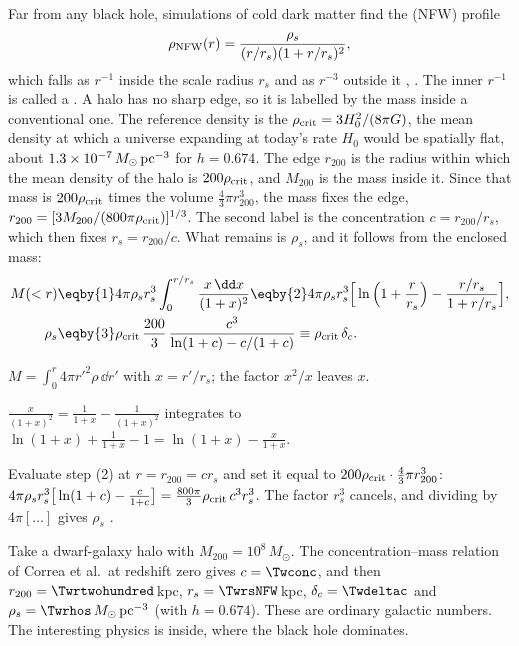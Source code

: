 Far from any black hole, simulations of cold dark matter find the  (NFW) profile
\begin{equation}
  \rho_{\rm NFW}(r)=\frac{\rho_s}{(r/r_s)(1+r/r_s)^2},
  \label{T2a:eq:nfw}
\end{equation}
which falls as $r^{-1}$ inside the scale radius $r_s$ and as $r^{-3}$ outside it \cite{NFW1996}, \cite[eq.~(1)]{NFW1997}. The inner $r^{-1}$ is called a . A halo has no sharp edge, so it is labelled by the mass inside a conventional one. The reference density is the  $\rho_{\rm crit}=3H_0^2/(8\pi G)$, the mean density at which a universe expanding at today's rate $H_0$ would be spatially flat, about $1.3\times10^{-7}\,M_\odot\,{\rm pc}^{-3}$ for $h=0.674$. The edge $r_{200}$ is the radius within which the mean density of the halo is $200\rho_{\rm crit}$, and $M_{200}$ is the mass inside it. Since that mass is $200\rho_{\rm crit}$ times the volume $\tfrac43\pi r_{200}^3$, the mass fixes the edge, $r_{200}=[3M_{200}/(800\pi\rho_{\rm crit})]^{1/3}$. The second label is the concentration $c=r_{200}/r_s$, which then fixes $r_s=r_{200}/c$. What remains is $\rho_s$, and it follows from the enclosed mass:
\begin{align}
  M(<r)&\eqby{1}4\pi\rho_sr_s^3\int_0^{r/r_s}\frac{x\,\dd x}{(1+x)^2}
  \eqby{2}4\pi\rho_sr_s^3\Big[\ln\Big(1+\frac r{r_s}\Big)-\frac{r/r_s}{1+r/r_s}\Big],\nonumber\\
  \rho_s&\eqby{3}\rho_{\rm crit}\,\frac{200}{3}\,\frac{c^3}{\ln(1+c)-c/(1+c)}\equiv\rho_{\rm crit}\,\delta_c .\label{T2a:eq:nfw-mass}
\end{align}
\begin{explain}
  \item $M=\int_0^r4\pi r'^2\rho\,\dd r'$ with $x=r'/r_s$; the factor $x^2/x$ leaves $x$.
  \item $\frac{x}{(1+x)^2}=\frac1{1+x}-\frac1{(1+x)^2}$ integrates to $\ln(1+x)+\frac1{1+x}-1=\ln(1+x)-\frac x{1+x}$.
  \item Evaluate step (2) at $r=r_{200}=cr_s$ and set it equal to $200\rho_{\rm crit}\cdot\tfrac43\pi r_{200}^3$:
        $4\pi\rho_sr_s^3\big[\ln(1+c)-\tfrac{c}{1+c}\big]=\tfrac{800\pi}{3}\rho_{\rm crit}\,c^3r_s^3$. The factor $r_s^3$ cancels, and dividing by $4\pi[\dots]$ gives $\rho_s$ \cite[eq.~(2)]{NFW1997}.
\end{explain}
Take a dwarf-galaxy halo with $M_{200}=10^8\,M_\odot$. The concentration--mass relation of Correa et al.\ at redshift zero \cite[eq.~(19)]{Correa2015} gives $c=\Twconc$, and then $r_{200}=\Twrtwohundred$\,kpc, $r_s=\TwrsNFW$\,kpc, $\delta_c=\Twdeltac$ and $\rho_s=\Twrhos\,M_\odot\,{\rm pc}^{-3}$ (with $h=0.674$). These are ordinary galactic numbers. The interesting physics is inside, where the black hole dominates.

